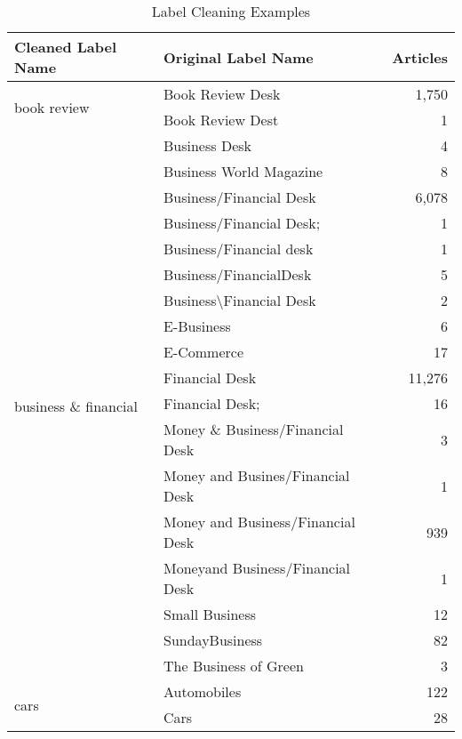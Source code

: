 \documentclass[11pt,a4paper]{article}
\begin{document}
\begin{table}
\centering
\small
\begin{tabular}{llr}
	\hline
	\textbf{Cleaned Label Name} & \textbf{Original Label Name} & \textbf{Articles} \\
	\hline
	\multirow{2}{*}{book review} & Book Review Desk & 1,750 \\
	& Book Review Dest & 1 \\
	\hline
	\multirow{18}{*}{business \& financial} & Business Desk & 4 \\
	& Business World Magazine & 8 \\
	& Business/Financial Desk & 6,078 \\
	& Business/Financial Desk; & 1 \\
	& Business/Financial desk & 1 \\
	& Business/FinancialDesk & 5 \\
	& Business\textbackslash Financial Desk & 2 \\
	& E-Business & 6 \\
	& E-Commerce & 17 \\
	& Financial Desk & 11,276 \\
	& Financial Desk; & 16 \\
	& Money \& Business/Financial Desk & 3 \\
	& Money and Busines/Financial Desk & 1 \\
	& Money and Business/Financial Desk & 939 \\
	& Moneyand Business/Financial Desk & 1 \\
	& Small Business & 12 \\
	& SundayBusiness & 82 \\
	& The Business of Green & 3 \\
	\hline
	\multirow{2}{*}{cars} & Automobiles & 122 \\
	& Cars & 28 \\
	\hline
\end{tabular}
\caption{Label Cleaning Examples}
\label{tbl:label-clean}
\end{table}
\end{document}
